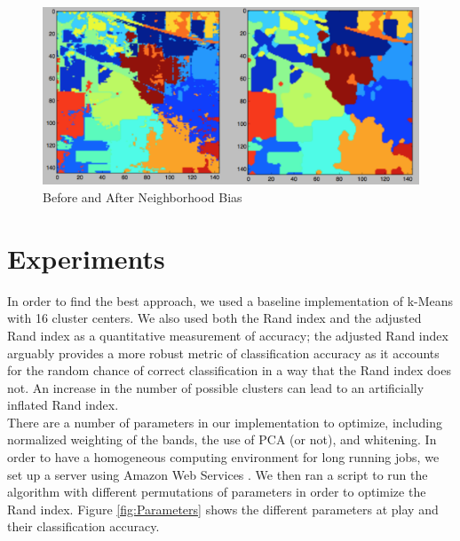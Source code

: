 \documentclass[journal]{IEEEtran}
\begin{document}
    \begin{figure}[h!]
      \centering\includegraphics[width=\columnwidth]{images/BandUnB.png}
      \caption{Before and After Neighborhood Bias}
      \label{fig:NeighborhoodBias}
    \end{figure}

\section{Experiments}
  In order to find the best approach, we used a baseline implementation of k-Means with 16 cluster centers. We also used both the Rand index and the adjusted Rand index as a quantitative measurement of accuracy; the adjusted Rand index arguably provides a more robust metric of classification accuracy as it accounts for the random chance of correct classification in a way that the Rand index does not. An increase in the number of possible clusters can lead to an artificially inflated Rand index.\\

  There are a number of parameters in our implementation to optimize, including normalized weighting of the bands, the use of PCA (or not), and whitening.  In order to have a homogeneous computing environment for long running jobs, we set up a server using Amazon Web Services \cite{AWS}. We then ran a script to run the algorithm with different permutations of parameters in order to optimize the Rand index. Figure \ref{fig:Parameters} shows the different parameters at play and their classification accuracy.\\
\end{document}

